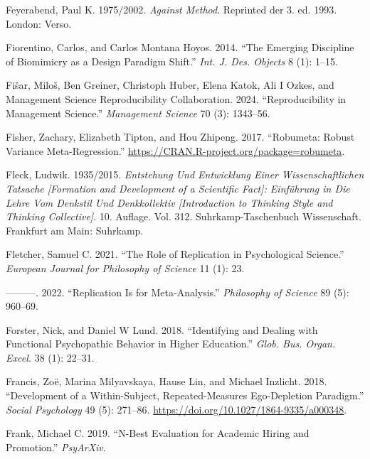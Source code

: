 \documentclass[
  letterpaper,
  DIV=11,
  numbers=noendperiod]{scrreprt}
\newlength{\cslhangindent}
\newenvironment{CSLReferences}[2] %
 {\begin{list}{}{%
  \setlength{\itemindent}{0pt}
  \setlength{\leftmargin}{0pt}
  \setlength{\parsep}{0pt}
  \ifodd #1
   \setlength{\leftmargin}{\cslhangindent}
   \setlength{\itemindent}{-1\cslhangindent}
  \fi
  \setlength{\itemsep}{#2\baselineskip}}}
 {\end{list}}
\begin{document}
\begin{CSLReferences}{1}{0}
Feyerabend, Paul K. 1975/2002. \emph{Against Method}. Reprinted der 3.
ed. 1993. London: Verso.

Fiorentino, Carlos, and Carlos Montana Hoyos. 2014. {``The Emerging
Discipline of Biomimicry as a Design Paradigm Shift.''} \emph{Int. J.
Des. Objects} 8 (1): 1--15.

Fišar, Miloš, Ben Greiner, Christoph Huber, Elena Katok, Ali I Ozkes,
and Management Science Reproducibility Collaboration. 2024.
{``Reproducibility in Management Science.''} \emph{Management Science}
70 (3): 1343--56.

Fisher, Zachary, Elizabeth Tipton, and Hou Zhipeng. 2017. {``Robumeta:
Robust Variance Meta-Regression.''}
\url{https://CRAN.R-project.org/package=robumeta}.

Fleck, Ludwik. 1935/2015. \emph{Entstehung Und Entwicklung Einer
Wissenschaftlichen Tatsache {[}Formation and Development of a Scientific
Fact{]}: Einf{ü}hrung in Die Lehre Vom Denkstil Und Denkkollektiv
{[}Introduction to Thinking Style and Thinking Collective{]}}. 10.
Auflage. Vol. 312. Suhrkamp-Taschenbuch Wissenschaft. Frankfurt am Main:
Suhrkamp.

Fletcher, Samuel C. 2021. {``The Role of Replication in Psychological
Science.''} \emph{European Journal for Philosophy of Science} 11 (1):
23.

---------. 2022. {``Replication Is for Meta-Analysis.''}
\emph{Philosophy of Science} 89 (5): 960--69.

Forster, Nick, and Daniel W Lund. 2018. {``Identifying and Dealing with
Functional Psychopathic Behavior in Higher Education.''} \emph{Glob.
Bus. Organ. Excel.} 38 (1): 22--31.

Francis, Zoë, Marina Milyavskaya, Hause Lin, and Michael Inzlicht. 2018.
{``Development of a Within-Subject, Repeated-Measures Ego-Depletion
Paradigm.''} \emph{Social Psychology} 49 (5): 271--86.
\url{https://doi.org/10.1027/1864-9335/a000348}.

Frank, Michael C. 2019. {``N-Best Evaluation for Academic Hiring and
Promotion.''} \emph{PsyArXiv}.


\end{CSLReferences}
\end{document}
